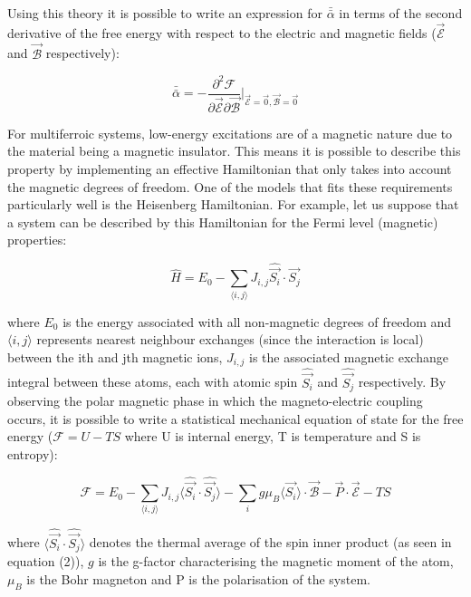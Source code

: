 \documentclass[10pt]{article}
\begin{document}
Using this theory it is possible to write an expression for $\bar{\bar{\alpha}}$ in terms of the second derivative of the free energy with respect to the electric and magnetic fields ($\vec{\mathcal{E}}$ and $\vec{\mathcal{B}}$ respectively):

\begin{equation}
\bar{\bar{\alpha}} = -\frac{\partial^2 \mathcal{F}}{\partial \vec{\mathcal{E}}\partial\vec{\mathcal{B}}}\biggr\vert_{\vec{\mathcal{E}}=\vec{0}, \vec{\mathcal{B}} = \vec{0}}
\end{equation}

For multiferroic systems, low-energy excitations are of a magnetic nature due to the material being a magnetic insulator. This means it is possible to describe this property by implementing an effective Hamiltonian that only takes into account the magnetic degrees of freedom. One of the models that fits these requirements particularly well is the Heisenberg Hamiltonian. For example, let us suppose that a system can be described by this Hamiltonian for the Fermi level (magnetic) properties:

\begin{equation}
\hat{H} = E_0 - \sum_{\langle i,j \rangle} J_{i,j}\hat{\vec{S_i}}\cdot \hat{\vec{S_j}}
\end{equation}

where $E_0$ is the energy associated with all non-magnetic degrees of freedom and $\langle i,j \rangle$ represents nearest neighbour exchanges (since the interaction is local) between the ith and jth magnetic ions, $J_{i,j}$ is the associated magnetic exchange integral between these atoms, each with atomic spin $\hat{\vec{S_i}}$ and $\hat{\vec{S_j}}$ respectively. By observing the polar magnetic phase in which the magneto-electric coupling occurs, it is possible to write a statistical mechanical equation of state for the free energy ($\mathcal{F} = U - TS$ where U is internal energy, T is temperature and S is entropy):

\begin{equation}
\mathcal{F} = E_0 - \sum_{\langle i,j \rangle} J_{i,j}\langle \hat{\vec{S_i}}\cdot \hat{\vec{S_j}} \rangle - \sum_{i}g\mu_{B}\langle \vec{S_i}\rangle \cdot \mathcal{\vec{B}} - \vec{P}\cdot \mathcal{\vec{E}} - TS
\end{equation}

where $\langle \hat{\vec{S_i}}\cdot \hat{\vec{S_j}} \rangle $ denotes the thermal average of the spin inner product (as seen in equation (2)), $g$ is the g-factor characterising the magnetic moment of the atom, $\mu_{B}$ is the Bohr magneton and P is the polarisation of the system. 
\end{document}
